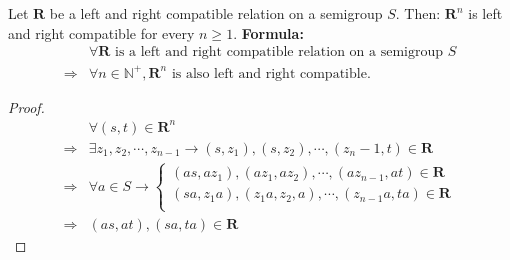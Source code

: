 \begin{Lem}\label{Lem:1.5.7}
    Let $\mathbf{R}$ be a left and right compatible relation on a semigroup $S$. Then: $\mathbf{R}^n$ is left and right compatible for every $n\geq 1$.
    \textbf{Formula: }
    \begin{align*}
        & \forall \mathbf{R} \text{ is a left and right compatible relation on a semigroup }S \\
        \Rightarrow &
        \forall n\in \mathbb{N}^+, \mathbf{R}^n \text{ is also left and right compatible.}
    \end{align*}

    \begin{proof}
        \begin{align*}
            & \forall (s,t)\in \mathbf{R}^n     \\
            \Rightarrow & \exists z_1,z_2,\cdots, z_{n-1}\rightarrow (s,z_1),(s,z_2),\cdots, (z_n-1,t) \in \mathbf{R}    \\
            \Rightarrow &\forall a \in S \rightarrow 
            \begin{cases}
                (as,az_1),(az_1,az_2),\cdots, (az_{n-1},a t) \in \mathbf{R}  \\
                (sa,z_1a),(z_1a,z_2,a),\cdots, (z_{n-1}a,ta) \in \mathbf{R}  \\ 
            \end{cases} \\
            \Rightarrow & (as,at),(sa,ta) \in \mathbf{R}
        \end{align*}
    \end{proof}
\end{Lem}

